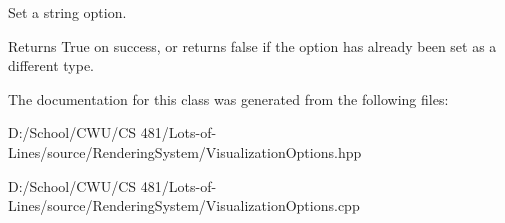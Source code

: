 Set a string option. 

\begin{DoxyReturn}{Returns}
True on success, or returns false if the option has already been set as a different type. 
\end{DoxyReturn}


The documentation for this class was generated from the following files\+:\begin{DoxyCompactItemize}
\item 
D\+:/\+School/\+C\+W\+U/\+C\+S 481/\+Lots-\/of-\/\+Lines/source/\+Rendering\+System/Visualization\+Options.\+hpp\item 
D\+:/\+School/\+C\+W\+U/\+C\+S 481/\+Lots-\/of-\/\+Lines/source/\+Rendering\+System/Visualization\+Options.\+cpp\end{DoxyCompactItemize}
